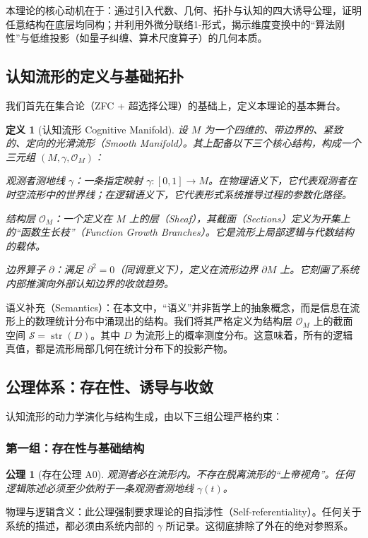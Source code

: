 \documentclass[11pt,a4paper]{article}
\newtheorem{definition}{定义}
\newtheorem{axiom}{公理}
\begin{document}
本理论的核心动机在于：通过引入代数、几何、拓扑与认知的四大诱导公理，证明任意结构在底层均同构；并利用外微分联络1-形式，揭示维度变换中的“算法刚性”与低维投影（如量子纠缠、算术尺度算子）的几何本质。

\subsection{认知流形的定义与基础拓扑}
我们首先在集合论（ZFC + 超选择公理）的基础上，定义本理论的基本舞台。

\begin{definition}[认知流形 Cognitive Manifold]
设 \(M\) 为一个四维的、带边界的、紧致的、定向的光滑流形（Smooth Manifold）。其上配备以下三个核心结构，构成一个三元组 \((M,\gamma,\mathcal O_M)\)：

观测者测地线 \(\gamma\)：一条指定映射 \(\gamma:[0,1]\to M\)。在物理语义下，它代表观测者在时空流形中的世界线；在逻辑语义下，它代表形式系统推导过程的参数化路径。

结构层 \(\mathcal O_M\)：一个定义在 \(M\) 上的层（Sheaf），其截面（Sections）定义为开集上的“函数生长枝”（Function Growth Branches）。它是流形上局部逻辑与代数结构的载体。

边界算子 \(\partial\)：满足 \(\partial^2=0\)（同调意义下），定义在流形边界 \(\partial M\) 上。它刻画了系统内部推演向外部认知边界的收敛趋势。
\end{definition}

语义补充（Semantics）：在本文中，“语义”并非哲学上的抽象概念，而是信息在流形上的数理统计分布中涌现出的结构。我们将其严格定义为结构层 \(\mathcal O_M\) 上的截面空间 \(\mathcal S=\operatorname{str}(D)\)。其中 \(D\) 为流形上的概率测度分布。这意味着，所有的逻辑真值，都是流形局部几何在统计分布下的投影产物。

\subsection{公理体系：存在性、诱导与收敛}
认知流形的动力学演化与结构生成，由以下三组公理严格约束：

\subsubsection{第一组：存在性与基础结构}
\begin{axiom}[存在公理 A0]
观测者必在流形内。不存在脱离流形的“上帝视角”。任何逻辑陈述必须至少依附于一条观测者测地线 \(\gamma(t)\)。
\end{axiom}

物理与逻辑含义：此公理强制要求理论的自指涉性（Self-referentiality）。任何关于系统的描述，都必须由系统内部的 \(\gamma\) 所记录。这彻底排除了外在的绝对参照系。
\end{document}
